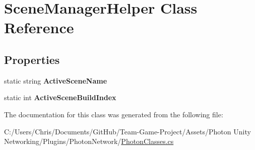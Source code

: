 \hypertarget{class_scene_manager_helper}{}\section{Scene\+Manager\+Helper Class Reference}
\label{class_scene_manager_helper}
\subsection*{Properties}
\begin{DoxyCompactItemize}
\item 
static string {\bfseries Active\+Scene\+Name}\hypertarget{class_scene_manager_helper_a177df3595c98493f06aeec0aca449743}{}\label{class_scene_manager_helper_a177df3595c98493f06aeec0aca449743}

\item 
static int {\bfseries Active\+Scene\+Build\+Index}\hypertarget{class_scene_manager_helper_ab6409a5985d706aa80a8c1add2f88cad}{}\label{class_scene_manager_helper_ab6409a5985d706aa80a8c1add2f88cad}

\end{DoxyCompactItemize}


The documentation for this class was generated from the following file\+:\begin{DoxyCompactItemize}
\item 
C\+:/\+Users/\+Chris/\+Documents/\+Git\+Hub/\+Team-\/\+Game-\/\+Project/\+Assets/\+Photon Unity Networking/\+Plugins/\+Photon\+Network/\hyperlink{_photon_classes_8cs}{Photon\+Classes.\+cs}\end{DoxyCompactItemize}
